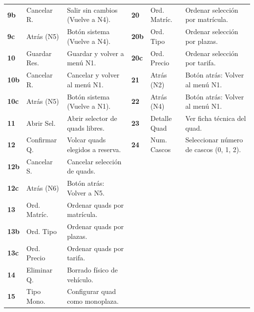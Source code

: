\documentclass[a4paper,landscape,11pt]{article}
\begin{document}
\begin{minipage}[t][\textheight][t]{\textwidth}
\begin{center}
\begin{minipage}{0.99\textwidth}
\begin{tabularx}{\textwidth}{@{} l l X | l l X @{}}
\textbf{9b} & Cancelar R. & Salir sin cambios (Vuelve a N4). & \textbf{20} & Ord. Matríc. & Ordenar selección por matrícula. \\
\textbf{9c} & Atrás (N5) & Botón sistema (Vuelve a N4). & \textbf{20b} & Ord. Tipo & Ordenar selección por plazas. \\
\textbf{10} & Guardar Res. & Guardar y volver a menú N1. & \textbf{20c} & Ord. Precio & Ordenar selección por tarifa. \\
\textbf{10b} & Cancelar R. & Cancelar y volver al menú N1. & \textbf{21} & Atrás (N2) & Botón atrás: Volver al menú N1. \\
\textbf{10c} & Atrás (N5) & Botón sistema (Vuelve a N1). & \textbf{22} & Atrás (N4) & Botón atrás: Volver al menú N1. \\
\textbf{11} & Abrir Sel. & Abrir selector de quads libres. & \textbf{23} & Detalle Quad & Ver ficha técnica del quad. \\
\textbf{12} & Confirmar Q. & Volcar quads elegidos a reserva. & \textbf{24} & Num. Cascos & Seleccionar número de cascos (0, 1, 2). \\
\textbf{12b} & Cancelar S. & Cancelar selección de quads. &  &  &  \\
\textbf{12c} & Atrás (N6) & Botón atrás: Volver a N5. &  &  &  \\
\textbf{13} & Ord. Matríc. & Ordenar quads por matrícula. &  &  &  \\
\textbf{13b} & Ord. Tipo & Ordenar quads por plazas. &  &  &  \\
\textbf{13c} & Ord. Precio & Ordenar quads por tarifa. &  &  &  \\
\textbf{14} & Eliminar Q. & Borrado físico de vehículo. &  &  &  \\
\textbf{15} & Tipo Mono. & Configurar quad como monoplaza. &  &  &  \\
\bottomrule
\end{tabularx}
\end{minipage}
\end{center}
\vfill
\end{minipage}
\end{document}
